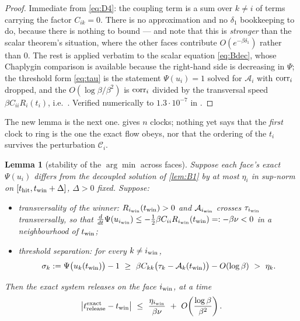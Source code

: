 \documentclass[11pt]{article}
\newtheorem{lemma}[theorem]{Lemma}
\theoremstyle{remark}
\newcommand{\thit}{t_{\mathrm{hit}}}
\newcommand{\Ar}{\mathcal{A}}
\begin{document}
\begin{proof}
Immediate from \eqref{eq:D4}: the coupling term is a sum over $k\ne i$ of terms
carrying the factor $C_{ik}=0$. There is no approximation and no $\delta_1$
bookkeeping to do, because there is nothing to bound --- and note that this is
\emph{stronger} than the scalar theorem's situation, where the other faces
contribute $O(e^{-\beta\delta_1})$ rather than $0$. The rest is
\cite[L4$'$(i)--(ii)]{paper} applied verbatim to the scalar equation
\eqref{eq:Bdec}, whose Chaplygin comparison is available because the right-hand
side is decreasing in $\Psi$; the threshold form \eqref{eq:tau} is the
statement $\Psi(u_i)=1$ solved for $\Ar_i$ with ${\rm corr}_i$ dropped, and the
$O(\log\beta/\beta^2)$ is ${\rm corr}_i$ divided by the transversal speed
$\beta C_{ii}R_i(t_i)$, i.e.\ \cite[L4$'$(ii)]{paper}. Verified numerically to
$1.3\cdot10^{-7}$ in \cite[I3]{scoping}.
\end{proof}

The new lemma is the next one.  gives $n$ clocks; nothing yet says
that the \emph{first} clock to ring is the one the exact flow obeys, nor that
the ordering of the $t_i$ survives the perturbation $\mathcal C_i$.

\begin{lemma}[stability of the $\arg\min$ across faces]\label{lem:argmin}
Suppose each face's exact $\Psi(u_i)$ differs from the decoupled solution of
\cref{lem:B1} by at most $\eta_i$ in sup-norm on $[\thit,t_{\rm win}+\Delta]$,
$\Delta>0$ fixed. Suppose:
\begin{itemize}
\item[\textup{(T)}] \emph{transversality of the winner}:
$R_{i_{\rm win}}(t_{\rm win})>0$ and $\Ar_{i_{\rm win}}$ crosses $\tau_{i_{\rm
win}}$ transversally, so that
$\frac{d}{dt}\Psi(u_{i_{\rm win}})\le-\tfrac12\beta C_{ii}R_{i_{\rm win}}(t_{\rm
win})=:-\beta\nu<0$ in a neighbourhood of $t_{\rm win}$;
\item[\textup{(S)}] \emph{threshold separation}: for every $k\ne i_{\rm win}$,
\[
\sigma_k:=\Psi\bigl(u_k(t_{\rm win})\bigr)-1
\ \ge\ \beta C_{kk}\bigl(\tau_k-\Ar_k(t_{\rm win})\bigr)-O(\log\beta)
\ >\ \eta_k .
\]
\end{itemize}
Then the exact system releases on the face $i_{\rm win}$, at a time
\begin{equation}\label{eq:argminshift}
\bigl|t^{\rm exact}_{\rm release}-t_{\rm win}\bigr|
\ \le\ \frac{\eta_{i_{\rm win}}}{\beta\nu}\ +\ O\!\left(\frac{\log\beta}{\beta^2}\right).
\end{equation}
\end{lemma}
\end{document}
